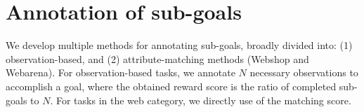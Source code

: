 \section{Annotation of sub-goals}
We develop multiple methods for annotating sub-goals, broadly divided into: (1) observation-based, and (2) attribute-matching methods (Webshop and Webarena). For observation-based tasks, we annotate $N$ necessary observations to accomplish a goal, where the obtained reward score is the ratio of completed sub-goals to $N$. For tasks in the web category, we directly use of the matching score.
